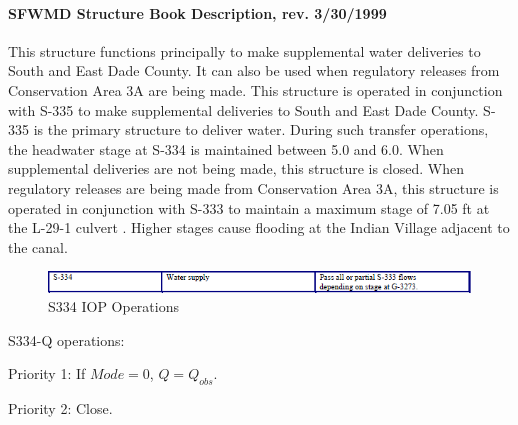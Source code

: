 \paragraph{SFWMD Structure Book Description, rev. 3/30/1999}
This structure functions principally to make supplemental water deliveries to South and East Dade County.
It can also be used when regulatory releases from Conservation Area 3A are being made.
This structure is operated in conjunction with S-335 to make supplemental deliveries to South and East Dade County.
S-335 is the primary structure to deliver water.
During such transfer operations, the headwater stage at S-334 is maintained between 5.0 and 6.0.
When supplemental deliveries are not being made, this structure is closed.
When regulatory releases are being made from Conservation Area 3A, this structure is operated in conjunction with S-333 to maintain a maximum stage of 7.05 ft at the L-29-1 culvert \cite{corp2005, SFWMD1994}.
Higher stages cause flooding at the Indian Village adjacent to the canal.



\begin{figure}[!h]
  \begin{center}
  \includegraphics[width=6.5in]{../figs/S334_IOPops.png}
  \caption{S334 IOP Operations}
  \label{fig:S334iop}
  \end{center}
\end{figure}



S334-Q operations:
\begin{packed_items}
\item Priority 1: If $Mode=0$, $Q = Q_{obs}$.
\item Priority 2: Close.
\end{packed_items}


